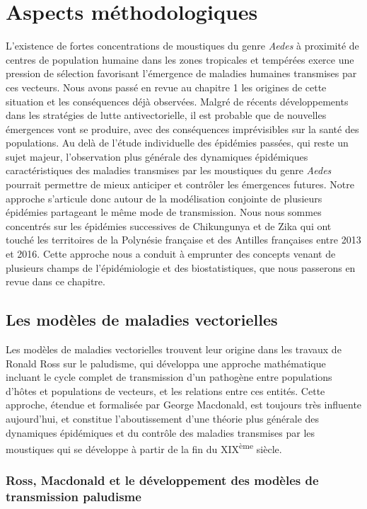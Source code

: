 \chapter{Aspects méthodologiques}
\chaptermark{}

L'existence de fortes concentrations de moustiques du genre {\em Aedes} à proximité de centres de population humaine dans les zones tropicales et tempérées exerce une pression de sélection favorisant l'émergence de maladies humaines transmises par ces vecteurs.
Nous avons passé en revue au chapitre 1 les origines de cette situation et les conséquences déjà observées.
Malgré de récents développements dans les stratégies de lutte antivectorielle, il est probable que de nouvelles émergences vont se produire, avec des conséquences imprévisibles sur la santé des populations.
Au delà de l'étude individuelle des épidémies passées, qui reste un sujet majeur, l'observation plus générale des dynamiques épidémiques caractéristiques des maladies transmises par les moustiques du genre {\em Aedes} pourrait permettre de mieux anticiper et contrôler les émergences futures.
Notre approche s'articule donc autour de la modélisation conjointe de plusieurs épidémies partageant le même mode de transmission.
Nous nous sommes concentrés sur les épidémies successives de Chikungunya et de Zika qui ont touché les territoires de la Polynésie française et des Antilles françaises entre 2013 et 2016.
Cette approche nous a conduit à emprunter des concepts venant de plusieurs champs de l'épidémiologie et des biostatistiques, que nous passerons en revue dans ce chapitre.

\section{Les modèles de maladies vectorielles}

Les modèles de maladies vectorielles trouvent leur origine dans les travaux de Ronald Ross sur le paludisme, 
qui développa une approche mathématique incluant le cycle complet de transmission d'un pathogène entre populations d'hôtes et populations de vecteurs, et les relations entre ces entités. 
Cette approche, étendue et formalisée par George Macdonald, est toujours très influente aujourd'hui, et constitue l'aboutissement d'une théorie plus générale des dynamiques épidémiques et du contrôle des maladies transmises par les moustiques qui se développe à partir de la fin du XIX\textsuperscript{ème} siècle.

\subsection{Ross, Macdonald et le développement des modèles de transmission paludisme}

